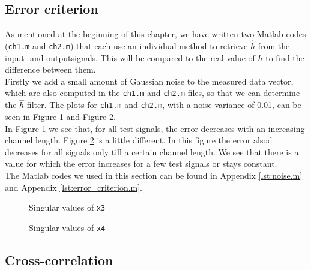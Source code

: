 \documentclass[final]{scrreprt} %
\begin{document}
\subsection{Error criterion}
As mentioned at the beginning of this chapter, we have written two Matlab codes (\texttt{ch1.m} and \texttt{ch2.m}) that each use an individual method to retrieve $\hat{h}$ from the input- and outputsignals.
This will be compared to the real value of $h$ to find the difference between them. \\
Firstly we add a small amount of Gaussian noise to the measured data vector, which are also computed in the \texttt{ch1.m} and \texttt{ch2.m} files, so that we can determine the $\hat{h}$ filter.
The plots for \texttt{ch1.m} and \texttt{ch2.m}, with a noise variance of 0.01, can be seen in Figure \ref{fig:error1} and Figure \ref{fig:error2}.\\
In Figure \ref{fig:error1} we see that, for all test signals, the error decreases with an increasing channel length.
Figure \ref{fig:error2} is a little different.
In this figure the error alsod decreases for all signals only till a certain channel length.
We see that there is a value for which the error increases for a few test signals or stays constant.\\
The Matlab codes we used in this section can be found in Appendix \ref{lst:noise.m} and Appendix \ref{lst:error_criterion.m}.


\begin{figure}[H]
	\centering
    	\setlength\figureheight{6cm}
    	\setlength\figurewidth{10cm}
    	    	
    	\caption{Singular values of \texttt{x3}}
    	\label{fig:error1}
\end{figure}

\begin{figure}[H]
	\centering
    	\setlength\figureheight{6cm}
    	\setlength\figurewidth{10cm}
    	    	
    	\caption{Singular values of \texttt{x4}}
    	\label{fig:error2}
\end{figure}


\subsection{Cross-correlation}
\end{document}
